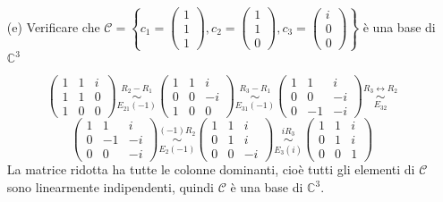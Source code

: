 \documentclass[a4paper]{article}
\theoremstyle{break}
\theoremstyle{break}
\theoremstyle{break}
\theoremstyle{break}
\begin{document}
\begin{enumerate}
	\item[(e)] Verificare che \( \mathcal{C} = \left\{
	      c_1 = \begin{pmatrix}
		      1 \\
		      1 \\
		      1
	      \end{pmatrix} ,
	      c_2 = \begin{pmatrix}
		      1 \\
		      1 \\
		      0
	      \end{pmatrix} ,
	      c_3 = \begin{pmatrix}
		      i \\
		      0 \\
		      0
	      \end{pmatrix}
	      \right\}  \)
	      è una base di \( \mathbb{C}^3 \)

	      \vspace{1em}
	      \[
		      \begin{pmatrix}
			      1 & 1 & i \\
			      1 & 1 & 0 \\
			      1 & 0 & 0
		      \end{pmatrix}
		      \underset{E_{21}(-1)}{\stackrel{R_2 - R_1}{\sim}}
		      \begin{pmatrix}
			      1 & 1 & i  \\
			      0 & 0 & -i \\
			      1 & 0 & 0
		      \end{pmatrix}
		      \underset{E_{31}(-1)}{\stackrel{R_3 - R_1}{\sim}}
		      \begin{pmatrix}
			      1 & 1  & i  \\
			      0 & 0  & -i \\
			      0 & -1 & -i
		      \end{pmatrix}
		      \underset{E_{32}}{\stackrel{R_3 \leftrightarrow R_2}{\sim}}
	      \]
	      \[
		      \begin{pmatrix}
			      1 & 1  & i  \\
			      0 & -1 & -i \\
			      0 & 0  & -i
		      \end{pmatrix}
		      \underset{E_{2}(-1)}{\stackrel{(-1)R_2}{\sim}}
		      \begin{pmatrix}
			      1 & 1 & i  \\
			      0 & 1 & i  \\
			      0 & 0 & -i
		      \end{pmatrix}
		      \underset{E_{3}(i)}{\stackrel{iR_3}{\sim}}
		      \begin{pmatrix}
			      1 & 1 & i \\
			      0 & 1 & i \\
			      0 & 0 & 1
		      \end{pmatrix}
	      \]
	      La matrice ridotta ha tutte le colonne dominanti, cioè tutti gli elementi
	      di \( \mathcal{C} \) sono linearmente indipendenti, quindi \( \mathcal{C} \) è una base di \( \mathbb{C}^3 \).



\end{enumerate}
\end{document}

